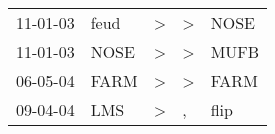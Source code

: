 \begin{supertabular}{p{0.07\textwidth}p{0.06\textwidth}p{0.02\textwidth}p{0.02\textwidth}p{0.06\textwidth}}
          11-01-03\textsuperscript{} &           feud\textsuperscript{} &  \textgreater &     \textgreater &  NOSE\textsuperscript{} \\
          11-01-03\textsuperscript{} &           NOSE\textsuperscript{} &  \textgreater &     \textgreater &  MUFB\textsuperscript{} \\
          06-05-04\textsuperscript{} &           FARM\textsuperscript{} &  \textgreater &     \textgreater &  FARM\textsuperscript{} \\
          09-04-04\textsuperscript{} &            LMS\textsuperscript{} &  \textgreater &                , &  flip\textsuperscript{} \\
\end{supertabular}
